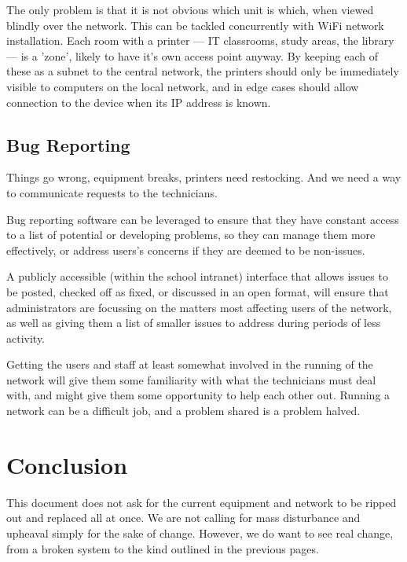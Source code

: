 \documentclass[a4paper,leqno,titlepage]{article}
\begin{document}
The only problem is that it is not obvious which unit is which, when viewed
blindly over the network. This can be tackled concurrently with WiFi network
installation. Each room with a printer  --- IT classrooms,
study areas, the library --- is a 'zone', likely to have it's own access point
anyway. By keeping each of these as a subnet to the central network, the
printers should only be immediately visible to computers on the local network,
and in edge cases should allow connection to the device when its IP address
is known.


\subsection{Bug Reporting}

Things go wrong, equipment breaks, printers need restocking. And we need a way
to communicate requests to the technicians.


Bug reporting software can be leveraged to ensure that they have constant access
to a list of potential or developing problems, so they can manage them more
effectively, or address users's concerns if they are deemed to be non-issues.


A publicly accessible (within the school intranet) interface that allows issues
to be posted, checked off as fixed, or discussed in an open format, will
ensure that administrators are focussing on the matters most affecting users of
the network, as well as giving them a list of smaller issues to address during
periods of less activity.


Getting the users and staff at least somewhat involved in the running
of the network will give them some familiarity with what the technicians must
deal with, and might give them some opportunity to help each other out.
Running a network can be a difficult job, and a problem shared is a problem
halved.



\break








\section{Conclusion}

This document does not ask for the current equipment and network to be ripped
out and replaced all at once. We are not calling for mass disturbance and
upheaval simply for the sake of change.
However, we do want to see real change, from a
broken system to the kind outlined in the previous pages.
\end{document}
